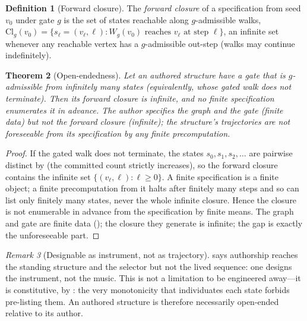 \documentclass[11pt,a4paper]{article}
\theoremstyle{thmstyle}
\newtheorem{theorem}{Theorem}[section]
\theoremstyle{definition}
\newtheorem{definition}[theorem]{Definition}
\theoremstyle{remark}
\newtheorem{remark}[theorem]{Remark}
\newcommand{\Walk}{W}                     %
\newcommand{\gate}{g}                     %
\begin{document}
\begin{definition}[Forward closure]
\label{def:forward-closure}
The \emph{forward closure} of a specification from seed $v_0$ under gate $\gate$
is the set of states reachable along $\gate$-admissible walks,
$\mathrm{Cl}_\gate(v_0)=\{s_\ell=(v_\ell,\ell): \Walk_\gate(v_0)\text{ reaches }
v_\ell\text{ at step }\ell\}$, an infinite set whenever any reachable vertex has a
$\gate$-admissible out-step \textup{(}walks may continue indefinitely\textup{)}.
\end{definition}

\begin{theorem}[Open-endedness]
\label{thm:open}
Let an authored structure have a gate that is $\gate$-admissible from infinitely
many states \textup{(}equivalently, whose gated walk does not terminate\textup{)}.
Then its forward closure is infinite, and no finite specification enumerates it
in advance. The author specifies the graph and the gate \textup{(}finite
data\textup{)} but not the forward closure \textup{(}infinite\textup{)}; the
structure's trajectories are not foreseeable from its specification by any finite
precomputation.
\end{theorem}

\begin{proof}
If the gated walk does not terminate, the states $s_0,s_1,s_2,\dots$ are pairwise
distinct by  (the committed count strictly increases), so the
forward closure contains the infinite set $\{(v_\ell,\ell):\ell\ge0\}$. A finite
specification is a finite object; a finite precomputation from it halts after
finitely many steps and so can list only finitely many states, never the whole
infinite closure. Hence the closure is not enumerable in advance from the
specification by finite means. The graph and gate are finite data
(); the closure they generate is infinite; the gap is exactly the
unforeseeable part.
\end{proof}

\begin{remark}[Designable as instrument, not as trajectory]
\label{rem:instrument}
 says authorship reaches the standing structure and the selector
but not the lived sequence: one designs the instrument, not the music. This is
not a limitation to be engineered away---it is constitutive, by
: the very monotonicity that individuates each state forbids
pre-listing them. An authored structure is therefore necessarily open-ended
relative to its author.
\end{remark}
\end{document}
